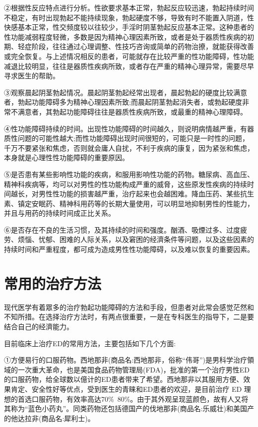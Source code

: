 \documentclass[12pt,UTF8]{ctexbook}
\begin{document}
②根据性反应特点进行分析。性欲要求基本正常，勃起反应较迅速，勃起持续时间不稳定，有时出现勃起不能持续现象，勃起硬度不够，导致有时不能置入阴道，性快感基本正常，性交频度较以往较少，手淫时阴茎勃起反应基本正常。这种患者的性功能减弱程度轻微，多数是因为精神心理因素所致，或者是处于器质性疾病的初期、轻症阶段，往往通过心理调整、性技巧咨询或简单的药物治撩，就能获得改善或完全恢复。与上述情况相反的患者，可能就存在比较严重的性功能障碍，性功能减退比较明显，往往是器质性疾病所致，或者存在严重的精神心理异常，需要尽早寻求医生的帮助。

③观察晨起阴茎勃起情况。晨起阴茎勃起经常出现者，晨起勃起的硬度比较满意者，勃起功能障碍多为精神心理因素所致;而晨起阴茎勃起消失者，或勃起硬度非常不满意者，其勃起功能障碍往往是器质性疾病所致，或最重的精神心理障碍。

④性功能障碍持续的时间。出现性功能障碍的时间越久，则说明病情越严重，有器质性问题的可能性越大;而性功能障碍出现时间很短的，可能只是一时性的问题，千万不要紧张和焦虑，否则就会庸人自扰，不利于疾病的康复，因为紧张和焦虑，本身就是心理性性功能障碍的重要原因。

⑤是否患有某些影响性功能的疾病，和服用影响性功能的药物。糖尿病、高血压、精神科疾病等，均可以对男性的性功能构成严重的威脅，这些原发性疾病的持续时间越长，对男性性功能的损害越严重，治疗起来也会越困难。降血压药、某些抗生素、镇定安眠药、精神科用药等的长期大量使用，可以明显地抑制男性的性能力，并且与用药的持续时间成正比关系。

⑥是否存在不良的生活习惯，及其持续的时间和强度。酗酒、吸煙过多、过度疲劳、烦惱、忧郁、困难的人际关系，以及窘困的经濟条件等问题，以及这些因素的持续时间和严重程度，都可成为造成男性性功能障碍，以及难以恢复的重要因素。

\section{常用的治疗方法}

现代医学有着眾多的治疗勃起功能障碍的方法和手段，但患者对此常会感觉茫然和不知所措。在选择治疗方法时，有两点很重要，一是在专科医生的指导下，二是要结合自己的经濟能力。

目前临床上治疗ED的常用方法，主要包括如下几个方面:

①方便易行的口服药物。西地那非(商品名:西地那非，俗称“伟哥”)是男科学治疗領域的一次重大革命，也是美国食品药物管理局(FDA)，批准的第一个治疗男性ED的口服药物，给全球数以億计的ED患者带来了希望。西地那非以其服用方便、效果肯定、安全性好等优点，受到医生的青睐和ED患者的欢迎，是目前治疗 ED 理想的首选口服药物，有效率高达70\%~80\%。由于其外观呈现蓝颜色，故有人又将其称为“蓝色小药丸”。同类药物还包括德国产的伐地那非(商品名:乐威壮)和美国产的他达拉非(商品名:犀利士)。
\end{document}
